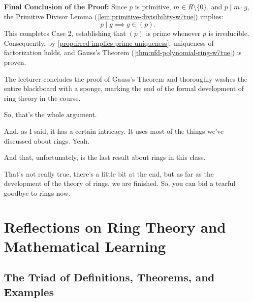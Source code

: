 \begin{proofWrapper}
\begin{content}
\textbf{Final Conclusion of the Proof:}
Since $p$ is primitive, $m \in R \setminus \{0\}$, and $p \mid m \cdot g$, the Primitive Divisor Lemma (\cref{lem:primitive-divisibility-w7tue}) implies:
\[
p \mid g \implies g \in (p).
\]
This completes Case 2, establishing that $(p)$ is prime whenever $p$ is irreducible. Consequently, by \cref{prop:irred-implies-prime-uniqueness}, uniqueness of factorization holds, and Gauss's Theorem (\cref{thm:ufd-polynomial-ring-w7tue}) is proven.
\end{content}

\end{proofWrapper}

\begin{hidden}
\end{hidden}

\begin{note}
The lecturer concludes the proof of Gauss's Theorem and thoroughly washes the entire blackboard with a sponge, marking the end of the formal development of ring theory in the course.
\end{note}

\begin{speech}[00:39:19 - 00:40:39]
So, that's the whole argument.

And, as I said, it has a certain intricacy. It uses most of the things we've discussed about rings. Yeah.

And that, unfortunately, is the last result about rings in this class.

That's not really true, there's a little bit at the end, but as far as the development of the theory of rings, we are finished. So, you can bid a tearful goodbye to rings now.

\end{speech}

\section{Reflections on Ring Theory and Mathematical Learning}

\subsection{The Triad of Definitions, Theorems, and Examples}

